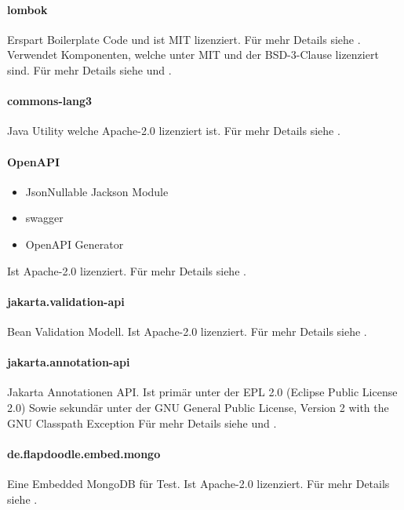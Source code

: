 \paragraph{lombok}
Erspart Boilerplate Code und ist MIT lizenziert.
Für mehr Details siehe .\\
Verwendet Komponenten, welche unter MIT und der BSD-3-Clause lizenziert sind.
Für mehr Details siehe  und .

\paragraph{commons-lang3}
Java Utility welche Apache-2.0 lizenziert ist.
Für mehr Details siehe .

\paragraph{OpenAPI}
\begin{itemize}
    \item JsonNullable Jackson Module
    \item swagger
    \item OpenAPI Generator
\end{itemize}
Ist Apache-2.0 lizenziert.
Für mehr Details siehe .

\paragraph{jakarta.validation-api}
Bean Validation Modell.
Ist Apache-2.0 lizenziert.
Für mehr Details siehe .

\paragraph{jakarta.annotation-api}
Jakarta Annotationen API.
Ist primär unter der EPL 2.0 (Eclipse Public License 2.0)
Sowie sekundär unter der GNU General Public License, Version 2 with the GNU Classpath Exception
Für mehr Details siehe  und .

\paragraph{de.flapdoodle.embed.mongo}
Eine Embedded MongoDB für Test.
Ist Apache-2.0 lizenziert.
Für mehr Details siehe .

